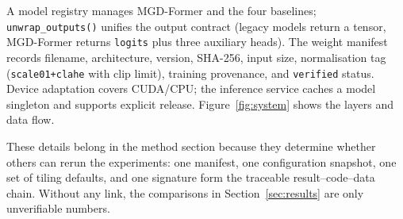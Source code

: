 A model registry manages MGD-Former and the four baselines; \texttt{unwrap\_outputs()} unifies the output contract (legacy models return a tensor, MGD-Former returns \texttt{logits} plus three auxiliary heads). The weight manifest records filename, architecture, version, SHA-256, input size, normalisation tag (\texttt{scale01+clahe} with clip limit), training provenance, and \texttt{verified} status. Device adaptation covers CUDA/CPU; the inference service caches a model singleton and supports explicit release. Figure~\ref{fig:system} shows the layers and data flow.



These details belong in the method section because they determine whether others can rerun the experiments: one manifest, one configuration snapshot, one set of tiling defaults, and one signature form the traceable result--code--data chain. Without any link, the comparisons in Section~\ref{sec:results} are only unverifiable numbers.
